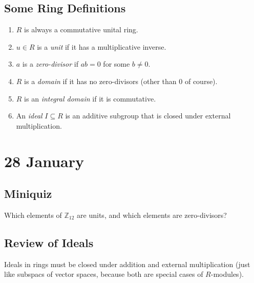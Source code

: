 \documentclass[12pt]{article}
\newcommand{\z}{\mathbb{Z}}
\newcommand{\ita}[1]{\textit{#1}}
\theoremstyle{definition}
\begin{document}
\subsection{Some Ring Definitions}
\begin{enumerate}
    \item $R$ is always a commutative unital ring.
    \item $u\in R$ is a \ita{unit} if it has a multiplicative inverse.
    \item $a$ is a \ita{zero-divisor} if $ab=0$ for some $b\neq0$.
    \item $R$ is a \ita{domain} if it has no zero-divisors (other than 0 of course).
    \item $R$ is an \ita{integral domain} if it is commutative.
    \item An \ita{ideal} $I\subseteq R$ is an additive subgroup that is closed under external multiplication.
\end{enumerate}
\section{28 January}
\subsection{Miniquiz}
Which elements of $\z_{12}$ are units, and which elements are zero-divisors?
\subsection{Review of Ideals}
Ideals in rings must be closed under addition and external multiplication (just like subspacs of vector spaces, because both are special cases of $R$-modules).
\end{document}
